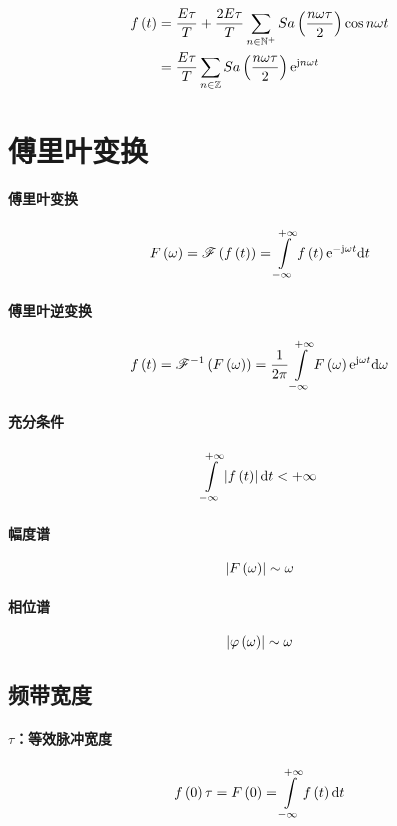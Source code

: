 \documentclass{article}
\begin{document}
\[\begin{aligned}
        f\left(t\right) & =\frac{E\tau}T+\frac{2E\tau}T\sum_{n\in\mathbb N^+}Sa\left(\frac{n\omega\tau}2\right)\cos n\omega t \\
            & =\frac{E\tau}T\sum_{n\in\mathbb Z} Sa\left(\frac{n\omega\tau}2\right)\mathrm e^{\mathrm j n\omega t}
    \end{aligned}\]

\section{傅里叶变换}

\paragraph{傅里叶变换}

\[\fw=\fourier\ft=\impint\ft\e^{-\j\omega t}\d t\]

\paragraph{傅里叶逆变换}

\[\ft=\ifourier{\fw}=\frac1{2\pi}\impint \fw\e^{\j\omega t}\d\omega\]

\paragraph{充分条件}

\[\impint\abs\ft\d t<+\infty\]

\paragraph{幅度谱}

\[\left|F\left(\omega\right)\right|\sim \omega\]

\paragraph{相位谱}

\[\left|\varphi\left(\omega\right)\right|\sim \omega\]

\subsection{频带宽度}

\paragraph{$\tau$：等效脉冲宽度}

\[f\pare{0}\tau=F\pare{0}=\impint\ft\d t\]
\end{document}
